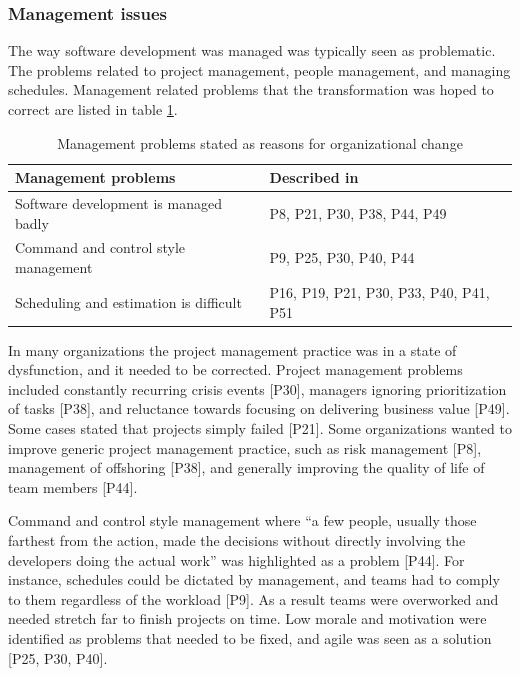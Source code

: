 \subsubsection{Management issues}

The way software development was managed was typically seen as problematic. The
problems related to project management, people management, and managing
schedules. Management related problems that the transformation was hoped to
correct are listed in table \ref{table:reasonstochange_management}.

\begin{table}[b]
    \centering
    \begin{tabular}{ >{\raggedright\arraybackslash}p{}
                     >{\raggedright\arraybackslash}p{} }
        \toprule
        Management problems           &  Described in  \\
        \midrule
        Software development is managed badly   &  P8, P21, P30, P38, P44, P49  \\
        Command and control style management    &  P9, P25, P30, P40, P44  \\
        Scheduling and estimation is difficult  &  P16, P19, P21, P30, P33, P40, P41, P51  \\
        \bottomrule
    \end{tabular}
    \caption{Management problems stated as reasons for organizational change}
    \label{table:reasonstochange_management}
\end{table}

In many organizations the project management practice was in a state of
dysfunction, and it needed to be corrected. Project management problems included
constantly recurring crisis events [P30], managers ignoring prioritization of
tasks [P38], and reluctance towards focusing on delivering business value [P49].
Some cases stated that projects simply failed [P21]. Some organizations wanted
to improve generic project management practice, such as risk management [P8],
management of offshoring [P38], and generally improving the quality of life of
team members [P44].

Command and control style management where ``a few people, usually those
farthest from the action, made the decisions without directly involving the
developers doing the actual work'' was highlighted as a problem [P44]. For
instance, schedules could be dictated by management, and teams had to comply to
them regardless of the workload [P9]. As a result teams were overworked and
needed stretch far to finish projects on time. Low morale and motivation were
identified as problems that needed to be fixed, and agile was seen as a solution
[P25, P30, P40].

